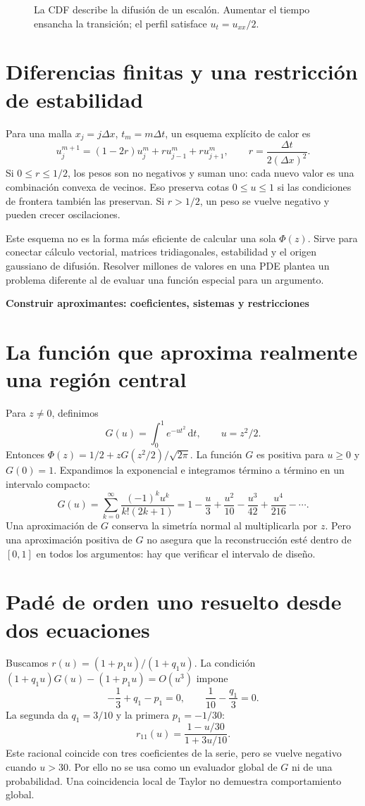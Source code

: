 \documentclass[11pt,a4paper]{article}
\newcommand{\dd}{\,\mathrm d}
\theoremstyle{definition}
\newcommand{\parte}[1]{\par\bigskip\Needspace{8\baselineskip}\begin{center}{\Large\bfseries\color{azul}#1}\end{center}}
\newcounter{problema}
\begin{document}
\begin{figure}[htbp]
\caption{La CDF describe la difusión de un escalón. Aumentar el tiempo ensancha la transición; el perfil satisface $u_t=u_{xx}/2$.}\label{fig:phi200-7}
\end{figure}
\section{Diferencias finitas y una restricción de estabilidad}
Para una malla $x_j=j\Delta x$, $t_m=m\Delta t$, un esquema explícito de calor es
\[
u_j^{m+1}=(1-2r)u_j^m+r u_{j-1}^m+r u_{j+1}^m,
\qquad r=\frac{\Delta t}{2(\Delta x)^2}.
\]
Si $0\le r\le1/2$, los pesos son no negativos y suman uno: cada nuevo valor es una combinación convexa de vecinos.
Eso preserva cotas $0\le u\le1$ si las condiciones de frontera también las preservan.
Si $r>1/2$, un peso se vuelve negativo y pueden crecer oscilaciones.

Este esquema no es la forma más eficiente de calcular una sola $\Phi(z)$.
Sirve para conectar cálculo vectorial, matrices tridiagonales, estabilidad y el origen gaussiano de difusión.
Resolver millones de valores en una PDE plantea un problema diferente al de evaluar una función especial para un argumento.



\parte{Construir aproximantes: coeficientes, sistemas y restricciones}
\section{La función que aproxima realmente una región central}
Para $z\ne0$, definimos
\[
G(u)=\int_0^1e^{-ut^2}\dd t,\qquad u=z^2/2.
\]
Entonces
$\Phi(z)=1/2+zG(z^2/2)/\sqrt{2\pi}$.
La función $G$ es positiva para $u\ge0$ y $G(0)=1$.
Expandimos la exponencial e integramos término a término en un intervalo compacto:
\[
G(u)=\sum_{k=0}^\infty\frac{(-1)^ku^k}{k!(2k+1)}
=1-\frac u3+\frac{u^2}{10}-\frac{u^3}{42}+\frac{u^4}{216}-\cdots.
\]
Una aproximación de $G$ conserva la simetría normal al multiplicarla por $z$.
Pero una aproximación positiva de $G$ no asegura que la reconstrucción esté dentro de $[0,1]$ en todos los argumentos: hay que verificar el intervalo de diseño.

\section{Padé de orden uno resuelto desde dos ecuaciones}
Buscamos $r(u)=(1+p_1u)/(1+q_1u)$.
La condición $(1+q_1u)G(u)-(1+p_1u)=O(u^3)$ impone
\[
-\frac13+q_1-p_1=0,\qquad
\frac1{10}-\frac{q_1}{3}=0.
\]
La segunda da $q_1=3/10$ y la primera $p_1=-1/30$:
\[
r_{11}(u)=\frac{1-u/30}{1+3u/10}.
\]
Este racional coincide con tres coeficientes de la serie, pero se vuelve negativo cuando $u>30$.
Por ello no se usa como un evaluador global de $G$ ni de una probabilidad.
Una coincidencia local de Taylor no demuestra comportamiento global.
\end{document}
